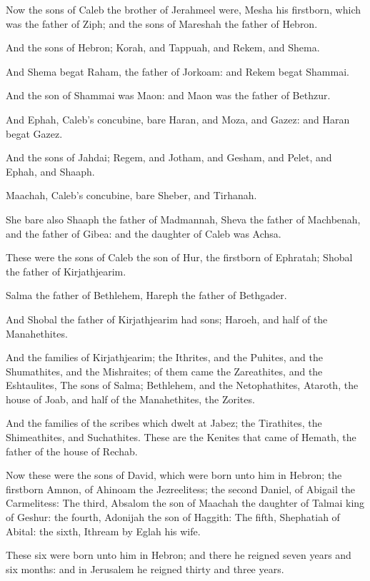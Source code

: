 \Verse Now the sons of Caleb the brother of Jerahmeel were, Mesha his firstborn, which was the father of Ziph; and the sons of Mareshah the father of Hebron.

\Verse And the sons of Hebron; Korah, and Tappuah, and Rekem, and Shema.

\Verse And Shema begat Raham, the father of Jorkoam: and Rekem begat Shammai.

\Verse And the son of Shammai was Maon: and Maon was the father of Bethzur.

\Verse And Ephah, Caleb's concubine, bare Haran, and Moza, and Gazez: and Haran begat Gazez.

\Verse And the sons of Jahdai; Regem, and Jotham, and Gesham, and Pelet, and Ephah, and Shaaph.

\Verse Maachah, Caleb's concubine, bare Sheber, and Tirhanah.

\Verse She bare also Shaaph the father of Madmannah, Sheva the father of Machbenah, and the father of Gibea: and the daughter of Caleb was Achsa.

\Verse These were the sons of Caleb the son of Hur, the firstborn of Ephratah; Shobal the father of Kirjathjearim.

\Verse Salma the father of Bethlehem, Hareph the father of Bethgader.

\Verse And Shobal the father of Kirjathjearim had sons; Haroeh, and half of the Manahethites.

\Verse And the families of Kirjathjearim; the Ithrites, and the Puhites, and the Shumathites, and the Mishraites; of them came the Zareathites, and the Eshtaulites, \Verse The sons of Salma; Bethlehem, and the Netophathites, Ataroth, the house of Joab, and half of the Manahethites, the Zorites.

\Verse And the families of the scribes which dwelt at Jabez; the Tirathites, the Shimeathites, and Suchathites. These are the Kenites that came of Hemath, the father of the house of Rechab.


\Chapter
\Verse Now these were the sons of David, which were born unto him in Hebron; the firstborn Amnon, of Ahinoam the Jezreelitess; the second Daniel, of Abigail the Carmelitess: \Verse The third, Absalom the son of Maachah the daughter of Talmai king of Geshur: the fourth, Adonijah the son of Haggith: \Verse The fifth, Shephatiah of Abital: the sixth, Ithream by Eglah his wife.

\Verse These six were born unto him in Hebron; and there he reigned seven years and six months: and in Jerusalem he reigned thirty and three years.

